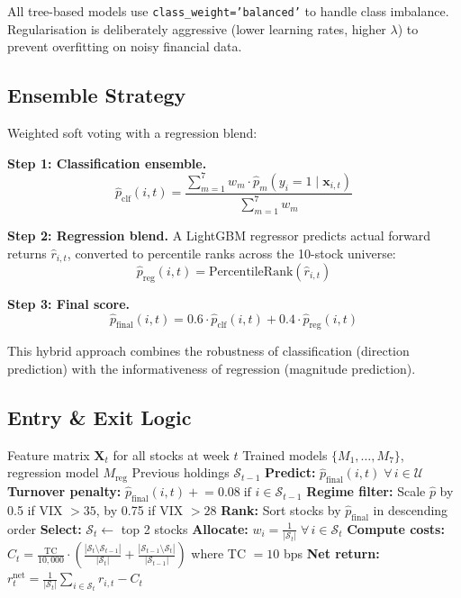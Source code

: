 \documentclass[12pt,a4paper]{article}
\begin{document}
All tree-based models use \texttt{class\_weight='balanced'} to handle class imbalance. Regularisation is deliberately aggressive (lower learning rates, higher $\lambda$) to prevent overfitting on noisy financial data.

\subsection{Ensemble Strategy}
Weighted soft voting with a regression blend:

\textbf{Step 1: Classification ensemble.}
\begin{equation}
    \hat{p}_{\text{clf}}(i,t) = \frac{\sum_{m=1}^{7} w_m \cdot \hat{p}_m(y_i = 1 \mid \mathbf{x}_{i,t})}{\sum_{m=1}^{7} w_m}
\end{equation}

\textbf{Step 2: Regression blend.} A LightGBM regressor predicts actual forward returns $\hat{r}_{i,t}$, converted to percentile ranks across the 10-stock universe:
\begin{equation}
    \hat{p}_{\text{reg}}(i,t) = \text{PercentileRank}(\hat{r}_{i,t})
\end{equation}

\textbf{Step 3: Final score.}
\begin{equation}
    \hat{p}_{\text{final}}(i,t) = 0.6 \cdot \hat{p}_{\text{clf}}(i,t) + 0.4 \cdot \hat{p}_{\text{reg}}(i,t)
\end{equation}

This hybrid approach combines the robustness of classification (direction prediction) with the informativeness of regression (magnitude prediction).

\subsection{Entry \& Exit Logic}

\begin{algorithm}[H]
\caption{Weekly Stock Selection Algorithm}
\begin{algorithmic}[1]
\Require Feature matrix $\mathbf{X}_t$ for all stocks at week $t$
\Require Trained models $\{M_1, \ldots, M_7\}$, regression model $M_{\text{reg}}$
\Require Previous holdings $\mathcal{S}_{t-1}$
\State \textbf{Predict:} $\hat{p}_{\text{final}}(i,t) \; \forall \, i \in \mathcal{U}$
\State \textbf{Turnover penalty:} $\hat{p}_{\text{final}}(i,t) \mathrel{+}= 0.08 \; \text{if } i \in \mathcal{S}_{t-1}$ 
\State \textbf{Regime filter:} Scale $\hat{p}$ by 0.5 if VIX $> 35$, by 0.75 if VIX $> 28$
\State \textbf{Rank:} Sort stocks by $\hat{p}_{\text{final}}$ in descending order
\State \textbf{Select:} $\mathcal{S}_t \leftarrow$ top 2 stocks
\State \textbf{Allocate:} $w_i = \frac{1}{|\mathcal{S}_t|} \; \forall \, i \in \mathcal{S}_t$
\State \textbf{Compute costs:} $C_t = \frac{\text{TC}}{10{,}000} \cdot \left(\frac{|\mathcal{S}_t \setminus \mathcal{S}_{t-1}|}{|\mathcal{S}_t|} + \frac{|\mathcal{S}_{t-1} \setminus \mathcal{S}_t|}{|\mathcal{S}_{t-1}|}\right)$ where TC $= 10$ bps
\State \textbf{Net return:} $r_t^{\text{net}} = \frac{1}{|\mathcal{S}_t|}\sum_{i \in \mathcal{S}_t} r_{i,t} - C_t$
\end{algorithmic}
\end{algorithm}
\end{document}

